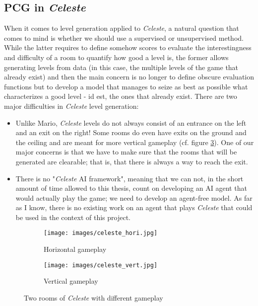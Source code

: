 \documentclass{article}
\newcommand{\Celeste}{\textit{Celeste} }
\newcommand{\Celnosp}{\textit{Celeste}}
\begin{document}
\subsection{PCG in \Celeste} \label{section:noAI}
When it comes to level generation applied to \Celnosp, a natural question that comes to mind is whether we should use a supervised or unsupervised method. While the latter requires to define somehow scores to evaluate the interestingness and difficulty of a room to quantify how good a level is, the former allows generating levels from data (in this case, the multiple levels of the game that already exist) and then the main concern is no longer to define obscure evaluation functions but to develop a model that manages to seize as best as possible what characterizes a good level - id est, the ones that already exist. There are two major difficulties in \Celeste level generation:
\begin{itemize}
    \item Unlike Mario, \Celeste levels do not always consist of an entrance on the left and an exit on the right! Some rooms do even have exits on the ground and the ceiling and are meant for more vertical gameplay (cf. figure \ref{fig:gp}). One of our major concerns is that we have to make sure that the rooms that will be generated are clearable; that is, that there is always a way to reach the exit.
    \item There is no "\Celeste AI framework", meaning that we can not, in the short amount of time allowed to this thesis, count on developing an AI agent that would actually play the game; we need to develop an agent-free model. As far as I know, there is no existing work on an agent that plays \Celeste that could be used in the context of this project.
\end{itemize}

\begin{figure}[h]
\centering
\begin{subfigure}{.5\linewidth}
  \centering
  \texttt{[image: images/celeste\_hori.jpg]}
  \caption{Horizontal gameplay}
  \label{fig:sub1}
\end{subfigure}%
\begin{subfigure}{.5\textwidth}
  \centering
  \texttt{[image: images/celeste\_vert.jpg]}
  \caption{Vertical gameplay}
  \label{fig:sub2}
\end{subfigure}
\caption{Two rooms of \Celeste with different gameplay}
\label{fig:gp}
\end{figure}
\end{document}
